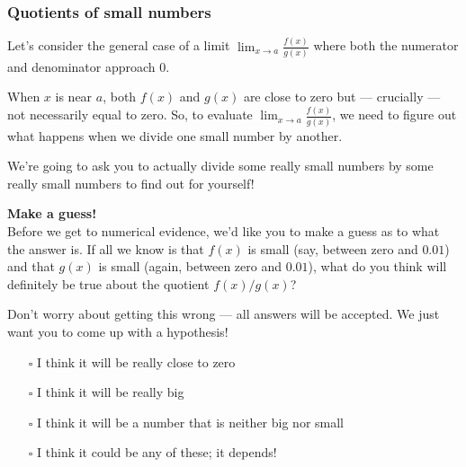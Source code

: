 \documentclass[pdftex, brazil, 12pt, twoside]{article}
\begin{document}
\subsubsection{Quotients of small numbers}
\label{u0-lim-quo-small}

Let's consider the general case of a limit $\displaystyle \lim_{x \to a}\frac{f(x)}{g(x)}$
where both the numerator and denominator approach $0$.

When $x$ is near $a$, both $f(x)$ and $g(x)$ are close to zero but --- crucially ---
not necessarily equal to zero. So, to evaluate $\displaystyle \lim_{x \to a}\frac{f(x)}{g(x)}$,
we need to figure out what happens when we divide one small number by another.

We're going to ask you to actually divide some really small numbers by some really
small numbers to find out for yourself!

\begin{exercise}
  \textbf{Make a guess!}\\
  Before we get to numerical evidence, we'd like you to make a guess as to what
  the answer is. If all we know is that $f(x)$ is small (say, between zero and $0.01$)
  and that $g(x)$ is small (again, between zero and $0.01$), what do you think will
  definitely be true about the quotient $f(x)/g(x)$?

  Don't worry about getting this
  wrong --- all answers will be accepted. We just want you to come up with a hypothesis!
  \begin{itemize}[noitemsep]
  \item[$\square$] I think it will be really close to zero
  \item[$\square$] I think it will be really big
  \item[$\square$] I think it will be a number that is neither big nor small
  \item[$\square$] I think it could be any of these; it depends!
  \end{itemize}
\end{exercise}
\end{document}
